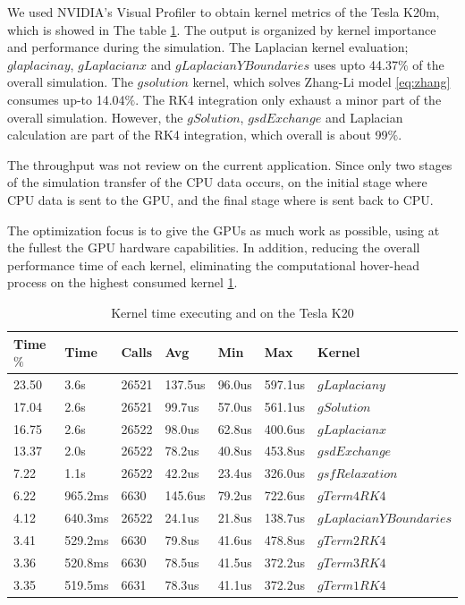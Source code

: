 We used NVIDIA's Visual Profiler to obtain kernel metrics of the Tesla K20m, which is showed in The table \ref{tab:nvprof}. The output is organized by kernel importance and performance during the simulation. The Laplacian kernel evaluation; $glaplacinay$, $gLaplacianx$ and  $gLaplacianYBoundaries$ uses upto 44.37$\%$ of the overall simulation. The $gsolution$ kernel, which solves Zhang-Li model \ref{eq:zhang} consumes up-to 14.04$\%$. The RK4 integration only exhaust a minor part of the overall simulation. However, the $gSolution$, $gsdExchange$ and Laplacian calculation are part of the RK4 integration, which overall is about 99$\%$.

The throughput was not review on the current application. Since only two stages of the simulation transfer of the CPU data occurs, on the initial stage where CPU data is sent to the GPU, and the final stage where is sent back to CPU.

 The optimization focus is to give the GPUs as much work as possible, using at the fullest the GPU hardware capabilities. In addition, reducing the overall performance time of each kernel, eliminating the computational hover-head process on the highest consumed kernel \ref{tab:nvprof}.
 
\begin{table}[h]
\centering
  \begin{tabular} { | l | l | l | l | l | l | l |}
    \hline
    Time$\%$& Time & Calls & Avg & Min & Max & Kernel \\
    \hline
    23.50 & 3.6s & 26521 & 137.5us & 96.0us & 597.1us&$gLaplaciany$ \\
    \hline
    17.04 & 2.6s & 26521 & 99.7us & 57.0us & 561.1us&$gSolution$ \\
    \hline
    16.75 & 2.6s & 26522 & 98.0us & 62.8us & 400.6us&$gLaplacianx$ \\
     \hline
      13.37 & 2.0s & 26522 & 78.2us & 40.8us & 453.8us&$gsdExchange$\\
      \hline
    7.22 & 1.1s & 26522 & 42.2us & 23.4us & 326.0us &$gsfRelaxation$\\
       \hline
    6.22 & 965.2ms & 6630 & 145.6us & 79.2us & 722.6us &$gTerm4RK4$\\
       \hline
    4.12 & 640.3ms & 26522 & 24.1us & 21.8us  &138.7us &$gLaplacianYBoundaries$\\
       \hline
    3.41  & 529.2ms & 6630 & 79.8us & 41.6us  & 478.8us & $gTerm2RK4$\\
       \hline
    3.36 & 520.8ms & 6630 & 78.5us & 41.5us & 372.2us & $gTerm3RK4$\\
       \hline
    3.35 & 519.5ms & 6631 & 78.3us & 41.1us & 372.2us & $gTerm1RK4$ \\
   \hline
  \end{tabular}
  \caption{Kernel time executing and on the Tesla K20}
  \label{tab:nvprof}
  \end{table}
 
